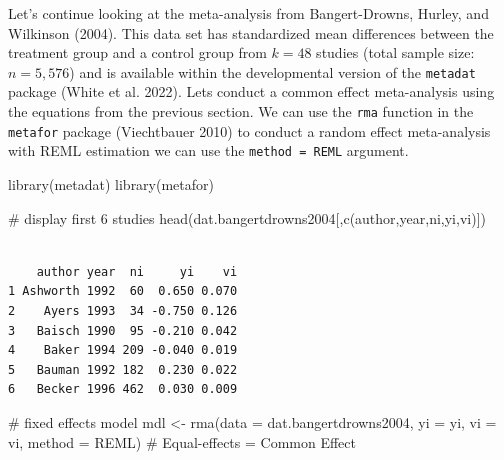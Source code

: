\documentclass[
  letterpaper,
  DIV=11,
  numbers=noendperiod]{scrreprt}
\newenvironment{Shaded}{}{}
\newcommand{\AttributeTok}[1]{\textcolor[rgb]{0.00,0.34,0.68}{#1}}
\newcommand{\CommentTok}[1]{\textcolor[rgb]{0.54,0.53,0.53}{#1}}
\newcommand{\FunctionTok}[1]{\textcolor[rgb]{0.39,0.29,0.61}{#1}}
\newcommand{\NormalTok}[1]{\textcolor[rgb]{0.12,0.11,0.11}{#1}}
\newcommand{\OtherTok}[1]{\textcolor[rgb]{0.00,0.43,0.16}{#1}}
\newcommand{\StringTok}[1]{\textcolor[rgb]{0.75,0.01,0.01}{#1}}
\begin{document}
\begin{tcolorbox}[enhanced jigsaw, toptitle=1mm, titlerule=0mm, arc=.35mm, breakable, colframe=quarto-callout-note-color-frame, title={Applied Example in R}, opacitybacktitle=0.6, opacityback=0, colbacktitle=quarto-callout-note-color!10!white, coltitle=black, bottomtitle=1mm, colback=white, bottomrule=.15mm, rightrule=.15mm, toprule=.15mm, leftrule=.75mm, left=2mm]

Let's continue looking at the meta-analysis from Bangert-Drowns, Hurley,
and Wilkinson (2004). This data set has standardized mean differences
between the treatment group and a control group from \(k=48\) studies
(total sample size: \(n=5,576\)) and is available within the
developmental version of the \texttt{metadat} package (White et al.
2022). Lets conduct a common effect meta-analysis using the equations
from the previous section. We can use the \texttt{rma} function in the
\texttt{metafor} package (Viechtbauer 2010) to conduct a random effect
meta-analysis with REML estimation we can use the
\texttt{method\ =\ \textquotesingle{}REML\textquotesingle{}} argument.

\begin{Shaded}
\begin{Highlighting}[]
\FunctionTok{library}\NormalTok{(metadat)}
\FunctionTok{library}\NormalTok{(metafor)}

\CommentTok{\# display first 6 studies}
\FunctionTok{head}\NormalTok{(dat.bangertdrowns2004[,}\FunctionTok{c}\NormalTok{(}\StringTok{\textquotesingle{}author\textquotesingle{}}\NormalTok{,}\StringTok{\textquotesingle{}year\textquotesingle{}}\NormalTok{,}\StringTok{\textquotesingle{}ni\textquotesingle{}}\NormalTok{,}\StringTok{\textquotesingle{}yi\textquotesingle{}}\NormalTok{,}\StringTok{\textquotesingle{}vi\textquotesingle{}}\NormalTok{)])}
\end{Highlighting}
\end{Shaded}

\begin{verbatim}

    author year  ni     yi    vi 
1 Ashworth 1992  60  0.650 0.070 
2    Ayers 1993  34 -0.750 0.126 
3   Baisch 1990  95 -0.210 0.042 
4    Baker 1994 209 -0.040 0.019 
5   Bauman 1992 182  0.230 0.022 
6   Becker 1996 462  0.030 0.009 
\end{verbatim}

\begin{Shaded}
\begin{Highlighting}[]
\CommentTok{\# fixed effects model}
\NormalTok{mdl }\OtherTok{\textless{}{-}} \FunctionTok{rma}\NormalTok{(}\AttributeTok{data =}\NormalTok{ dat.bangertdrowns2004,}
           \AttributeTok{yi =}\NormalTok{ yi,}
           \AttributeTok{vi =}\NormalTok{ vi,}
           \AttributeTok{method =} \StringTok{\textquotesingle{}REML\textquotesingle{}}\NormalTok{) }\CommentTok{\# Equal{-}effects = Common Effect}


\end{Highlighting}
\end{Shaded}
\end{tcolorbox}
\end{document}
